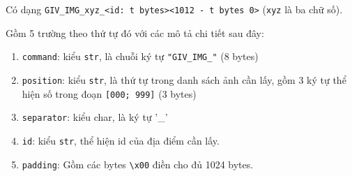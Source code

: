 \begin{enumerate}
\begin{enumerate}
Có dạng \texttt{GIV{\_}IMG{\_}xyz{\_}<id: t bytes><1012 - t bytes 0>} (\texttt{xyz} là ba chữ số).

Gồm 5 trường theo thứ tự đó với các mô tả chi tiết sau đây:

\begin{enumerate}
\item \texttt{command}: kiểu \texttt{str}, là chuỗi ký tự \texttt{"GIV{\_}IMG{\_}"} (8 bytes)
\item \texttt{position}: kiểu \texttt{str}, là thứ tự trong danh sách ảnh cần lấy, gồm 3 ký tự thể hiện số trong đoạn \texttt{[000; 999]} (3 bytes)
\item \texttt{separator}: kiểu char, là ký tự '{\_}'
\item \texttt{id}: kiểu \texttt{str}, thể hiện id của địa điểm cần lấy.
\item \texttt{padding}: Gồm các bytes \texttt{\textbackslash x00} điền cho đủ 1024 bytes.
\end{enumerate}
\end{enumerate}
\end{enumerate}
